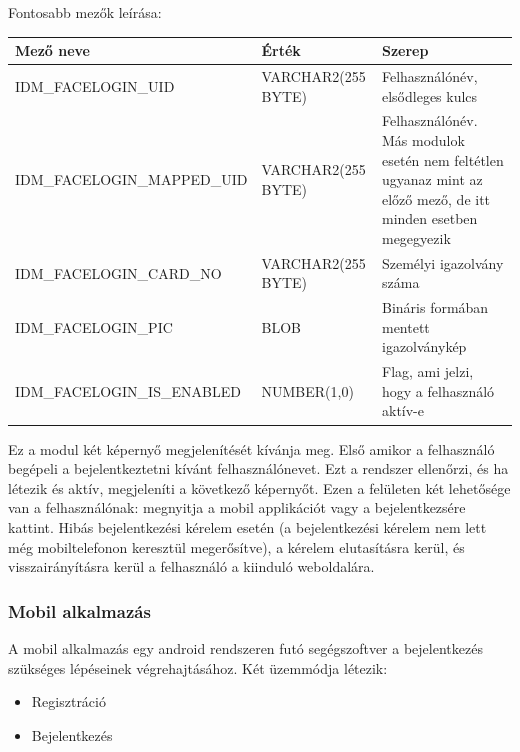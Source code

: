 Fontosabb mezők leírása:

\begin{tabular}{|p{6.5cm}|p{3cm} |p{4cm}|}
   	\hline
	\textbf{Mező neve} & \textbf{Érték} & \textbf{Szerep}\\ \hline
	IDM\_FACELOGIN\_UID & VARCHAR2(255 BYTE) & Felhasználónév, elsődleges kulcs \\ \hline
	IDM\_FACELOGIN\_MAPPED\_UID & VARCHAR2(255 BYTE) & Felhasználónév. Más modulok esetén nem feltétlen ugyanaz mint az előző mező, de itt minden esetben megegyezik \\ \hline
	IDM\_FACELOGIN\_CARD\_NO & VARCHAR2(255 BYTE)& Személyi igazolvány száma \\ \hline
	IDM\_FACELOGIN\_PIC & BLOB & Bináris formában mentett igazolványkép \\ \hline
	IDM\_FACELOGIN\_IS\_ENABLED & NUMBER(1,0) & Flag, ami jelzi, hogy a felhasználó aktív-e \\ \hline
	\end{tabular}


Ez a modul két képernyő megjelenítését kívánja meg. Első amikor a felhasználó begépeli a bejelentkeztetni kívánt felhasználónevet. Ezt a rendszer ellenőrzi, és ha létezik és aktív, megjeleníti a következő képernyőt. Ezen a felületen két lehetősége van a felhasználónak: megnyitja a mobil applikációt vagy a bejelentkezsére kattint. Hibás bejelentkezési kérelem esetén (a bejelentkezési kérelem nem lett még mobiltelefonon keresztül megerősítve), a kérelem elutasításra kerül, és visszairányításra kerül a felhasználó a kiinduló weboldalára.

\subsubsection{Mobil alkalmazás}
A mobil alkalmazás egy android rendszeren futó segégszoftver a bejelentkezés szükséges lépéseinek végrehajtásához. Két üzemmódja létezik:
\begin{itemize}
\item Regisztráció
\item Bejelentkezés
\end{itemize}

